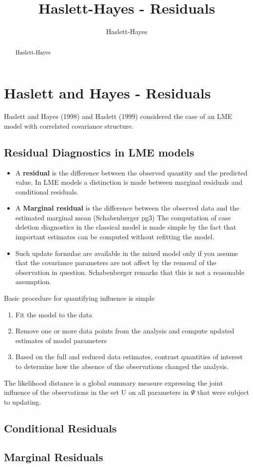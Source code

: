 \documentclass[]{article}
\title{Haslett-Hayes - Residuals}
\author{Haslett-Hayes}
\begin{document}
\maketitle

\begin{abstract}
Haslett-Hayes
\end{abstract}
\section*{Haslett and Hayes - Residuals}
Haslett and Hayes (1998) and Haslett (1999) considered the case of an LME model with correlated covariance structure.

\subsection{Residual Diagnostics in LME models}
\begin{itemize}
\item A \textbf{residual} is the difference between the observed quantity and the predicted value. In LME models a distinction is made between marginal residuals and conditional residuals.

\item A \textbf{Marginal residual} is the difference between the observed data and the estimated marginal mean (Schabenberger  pg3)
The computation of case deletion diagnostics in the classical model is made simple by the fact that important estimates can be computed without refitting the model. 

\item Such update formulae are available in the mixed model only if you assume that the covariance parameters are not affect by the removal of the observation in question. Schabenberger remarks that this is not a reasonable assumption.

\end{itemize}


Basic procedure for quantifying influence is simple

\begin{enumerate}
\item  	Fit the model to the data
\item   	Remove one or more data points from the analysis and compute updated estimates of model parameters
\item  	Based on the full and reduced data estimates, contrast quantities of interest to determine how the absence of the observations changed the analysis.
\end{enumerate}
The likelihood distance is a global summary measure expressing the joint influence of the observations in the set U on all parameters in $\Psi$ that were subject to updating.
 

\subsection*{Conditional Residuals}

\subsection*{Marginal Residuals}



\end{document}
